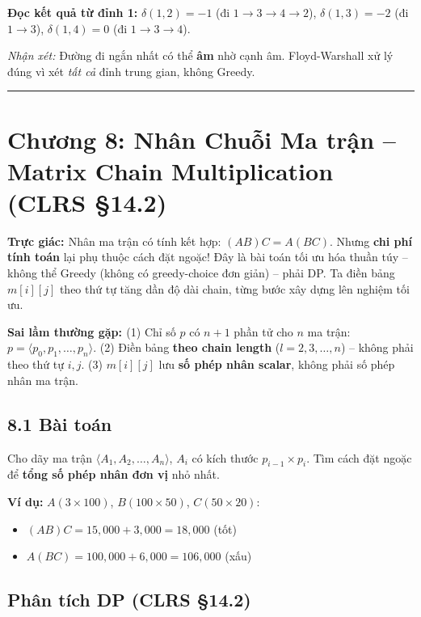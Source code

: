 \documentclass[10pt]{article}
\newcommand{\intuition}[1]{%
  \begin{tcolorbox}[colback=blue!5!white, colframe=blue!60!white, leftrule=3pt,
    toprule=0pt, bottomrule=0pt, rightrule=0pt,
    boxsep=2pt, left=6pt, right=6pt, top=4pt, bottom=4pt]
  \small\textbf{\textcolor{blue!80!black}{Trực giác: }}#1
  \end{tcolorbox}}
\newcommand{\pitfall}[1]{%
  \begin{tcolorbox}[colback=red!5!white, colframe=red!60!white, leftrule=3pt,
    toprule=0pt, bottomrule=0pt, rightrule=0pt,
    boxsep=2pt, left=6pt, right=6pt, top=4pt, bottom=4pt]
  \small\textbf{\textcolor{red!70!black}{Sai lầm thường gặp: }}#1
  \end{tcolorbox}}
\providecommand{\tightlist}{\setlength{\itemsep}{0pt}\setlength{\parskip}{0pt}}
\begin{document}
\textbf{Đọc kết quả từ đỉnh 1:} $\delta(1,2) = -1$ (đi $1 \to 3 \to 4 \to 2$), $\delta(1,3) = -2$ (đi $1 \to 3$), $\delta(1,4) = 0$ (đi $1 \to 3 \to 4$).

\textit{Nhận xét:} Đường đi ngắn nhất có thể \textbf{âm} nhờ cạnh âm. Floyd-Warshall xử lý đúng vì xét \textit{tất cả} đỉnh trung gian, không Greedy.

\begin{center}\rule{0.5\linewidth}{0.5pt}\end{center}

\section{Chương 8: Nhân Chuỗi Ma trận -- Matrix Chain Multiplication (CLRS \S 14.2)}\label{chux1b0ux1a1ng-8-nhuxe2n-chuux1ed7i-ma-trux1eadn-clrs-14.2}

\intuition{Nhân ma trận có tính kết hợp: $(AB)C = A(BC)$. Nhưng \textbf{chi phí tính toán} lại phụ thuộc cách đặt ngoặc! Đây là bài toán tối ưu hóa thuần túy -- không thể Greedy (không có greedy-choice đơn giản) -- phải DP. Ta điền bảng $m[i][j]$ theo thứ tự tăng dần độ dài chain, từng bước xây dựng lên nghiệm tối ưu.}

\pitfall{(1) Chỉ số $p$ có $n+1$ phần tử cho $n$ ma trận: $p = \langle p_0, p_1, \ldots, p_n \rangle$. (2) Điền bảng \textbf{theo chain length} ($l = 2, 3, \ldots, n$) -- không phải theo thứ tự $i, j$. (3) $m[i][j]$ lưu \textbf{số phép nhân scalar}, không phải số phép nhân ma trận.}

\subsection{8.1 Bài toán}\label{buxe0i-touxe1n}

Cho dãy ma trận \(\langle A_1, A_2, \ldots, A_n \rangle\), \(A_i\) có
kích thước \(p_{i-1} \times p_i\). Tìm cách đặt ngoặc để \textbf{tổng số
phép nhân đơn vị} nhỏ nhất.

\textbf{Ví dụ:} \(A(3 \times 100)\), \(B(100 \times 50)\),
\(C(50 \times 20)\):

\begin{itemize}
\tightlist
\item
  \((AB)C = 15{,}000 + 3{,}000 = 18{,}000\) (tốt)
\item
  \(A(BC) = 100{,}000 + 6{,}000 = 106{,}000\) (xấu)
\end{itemize}

\subsection{\texorpdfstring{Phân tích DP (CLRS
\S 14.2)}{Phân tích DP (CLRS 14.2)}}\label{phuxe2n-tuxedch-dp-clrs-14.2}
\end{document}
